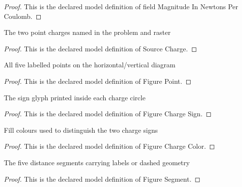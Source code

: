 \begin{proof}
  This is the declared model definition of field Magnitude In Newtons Per Coulomb.
\end{proof}
\begin{definition}
  \label{def:physics:phyx-mini-0994:phyxminiproblems-problemphyxmini0994-sourcecharge}
  The two point charges named in the problem and raster
\end{definition}
\begin{proof}
  This is the declared model definition of Source Charge.
\end{proof}
\begin{definition}
  \label{def:physics:phyx-mini-0994:phyxminiproblems-problemphyxmini0994-figurepoint}
  All five labelled points on the horizontal/vertical diagram
\end{definition}
\begin{proof}
  This is the declared model definition of Figure Point.
\end{proof}
\begin{definition}
  \label{def:physics:phyx-mini-0994:phyxminiproblems-problemphyxmini0994-figurechargesign}
  The sign glyph printed inside each charge circle
\end{definition}
\begin{proof}
  This is the declared model definition of Figure Charge Sign.
\end{proof}
\begin{definition}
  \label{def:physics:phyx-mini-0994:phyxminiproblems-problemphyxmini0994-figurechargecolor}
  Fill colours used to distinguish the two charge signs
\end{definition}
\begin{proof}
  This is the declared model definition of Figure Charge Color.
\end{proof}
\begin{definition}
  \label{def:physics:phyx-mini-0994:phyxminiproblems-problemphyxmini0994-figuresegment}
  The five distance segments carrying labels or dashed geometry
\end{definition}
\begin{proof}
  This is the declared model definition of Figure Segment.
\end{proof}
